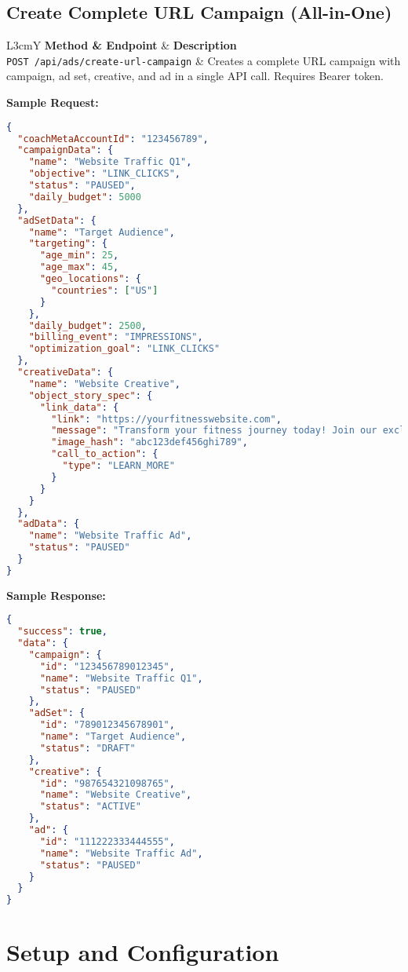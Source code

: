 \documentclass[11pt,a4paper]{article}
\begin{document}
\subsection{Create Complete URL Campaign (All-in-One)}
\begin{longtable}{L{3cm}Y}
\toprule
\textbf{Method \& Endpoint} & \textbf{Description} \\
\midrule
\texttt{POST /api/ads/create-url-campaign} & Creates a complete URL campaign with campaign, ad set, creative, and ad in a single API call. Requires Bearer token. \\
\bottomrule
\end{longtable}

\textbf{Sample Request:}
\begin{lstlisting}[language=json]
{
  "coachMetaAccountId": "123456789",
  "campaignData": {
    "name": "Website Traffic Q1",
    "objective": "LINK_CLICKS",
    "status": "PAUSED",
    "daily_budget": 5000
  },
  "adSetData": {
    "name": "Target Audience",
    "targeting": {
      "age_min": 25,
      "age_max": 45,
      "geo_locations": {
        "countries": ["US"]
      }
    },
    "daily_budget": 2500,
    "billing_event": "IMPRESSIONS",
    "optimization_goal": "LINK_CLICKS"
  },
  "creativeData": {
    "name": "Website Creative",
    "object_story_spec": {
      "link_data": {
        "link": "https://yourfitnesswebsite.com",
        "message": "Transform your fitness journey today! Join our exclusive program and see real results in just 30 days.",
        "image_hash": "abc123def456ghi789",
        "call_to_action": {
          "type": "LEARN_MORE"
        }
      }
    }
  },
  "adData": {
    "name": "Website Traffic Ad",
    "status": "PAUSED"
  }
}
\end{lstlisting}

\textbf{Sample Response:}
\begin{lstlisting}[language=json]
{
  "success": true,
  "data": {
    "campaign": {
      "id": "123456789012345",
      "name": "Website Traffic Q1",
      "status": "PAUSED"
    },
    "adSet": {
      "id": "789012345678901",
      "name": "Target Audience",
      "status": "DRAFT"
    },
    "creative": {
      "id": "987654321098765",
      "name": "Website Creative",
      "status": "ACTIVE"
    },
    "ad": {
      "id": "111222333444555",
      "name": "Website Traffic Ad",
      "status": "PAUSED"
    }
  }
}
\end{lstlisting}

\section{Setup and Configuration}
\end{document}
